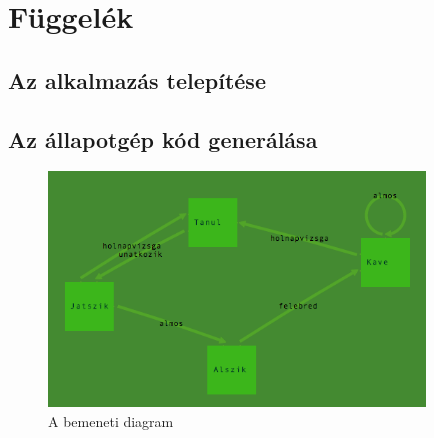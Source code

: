 \appendix
\chapter*{Függelék}
\setcounter{chapter}{6}  %
\setcounter{equation}{0} %

\section{Az alkalmazás telepítése}


\clearpage\section{Az állapotgép kód generálása}

\begin{figure}[!ht]
\centering
\includegraphics[width=100mm, keepaspectratio]{figures/tanulo.png}
\caption{A bemeneti diagram} 
\end{figure}


